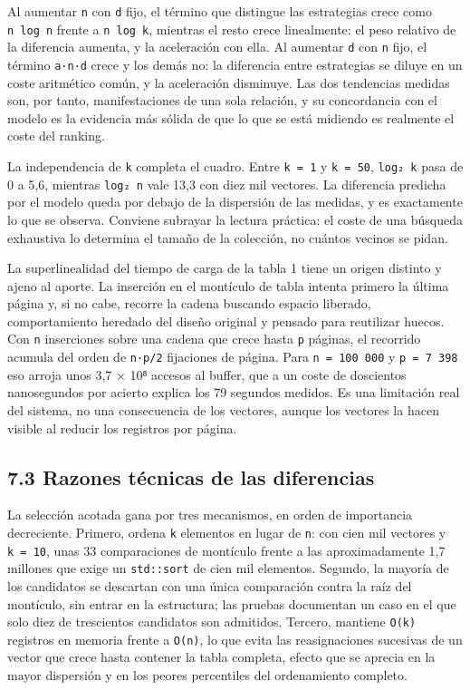 \documentclass[11pt,a4paper]{article}
\let\pandocsubsection\subsection
\let\subsection\section
\let\subsubsection\pandocsubsection
\begin{document}
Al aumentar \texttt{n} con \texttt{d} fijo, el término que distingue las
estrategias crece como \texttt{n\ log\ n} frente a \texttt{n\ log\ k},
mientras el resto crece linealmente: el peso relativo de la diferencia
aumenta, y la aceleración con ella. Al aumentar \texttt{d} con
\texttt{n} fijo, el término \texttt{a·n·d} crece y los demás no: la
diferencia entre estrategias se diluye en un coste aritmético común, y
la aceleración disminuye. Las dos tendencias medidas son, por tanto,
manifestaciones de una sola relación, y su concordancia con el modelo es
la evidencia más sólida de que lo que se está midiendo es realmente el
coste del ranking.

La independencia de \texttt{k} completa el cuadro. Entre
\texttt{k\ =\ 1} y \texttt{k\ =\ 50}, \texttt{log₂\ k} pasa de 0 a 5,6,
mientras \texttt{log₂\ n} vale 13,3 con diez mil vectores. La diferencia
predicha por el modelo queda por debajo de la dispersión de las medidas,
y es exactamente lo que se observa. Conviene subrayar la lectura
práctica: el coste de una búsqueda exhaustiva lo determina el tamaño de
la colección, no cuántos vecinos se pidan.

La superlinealidad del tiempo de carga de la tabla 1 tiene un origen
distinto y ajeno al aporte. La inserción en el montículo de tabla
intenta primero la última página y, si no cabe, recorre la cadena
buscando espacio liberado, comportamiento heredado del diseño original y
pensado para reutilizar huecos. Con \texttt{n} inserciones sobre una
cadena que crece hasta \texttt{p} páginas, el recorrido acumula del
orden de \texttt{n·p/2} fijaciones de página. Para
\texttt{n\ =\ 100\ 000} y \texttt{p\ =\ 7\ 398} eso arroja unos 3,7 ×
10⁸ accesos al buffer, que a un coste de doscientos nanosegundos por
acierto explica los 79 segundos medidos. Es una limitación real del
sistema, no una consecuencia de los vectores, aunque los vectores la
hacen visible al reducir los registros por página.

\subsubsection{7.3 Razones técnicas de las
diferencias}\label{73-razones-tuxe9cnicas-de-las-diferencias}

La selección acotada gana por tres mecanismos, en orden de importancia
decreciente. Primero, ordena \texttt{k} elementos en lugar de
\texttt{n}: con cien mil vectores y \texttt{k\ =\ 10}, unas 33
comparaciones de montículo frente a las aproximadamente 1,7 millones que
exige un \texttt{std::sort} de cien mil elementos. Segundo, la mayoría
de los candidatos se descartan con una única comparación contra la raíz
del montículo, sin entrar en la estructura; las pruebas documentan un
caso en el que solo diez de trescientos candidatos son admitidos.
Tercero, mantiene \texttt{O(k)} registros en memoria frente a
\texttt{O(n)}, lo que evita las reasignaciones sucesivas de un vector
que crece hasta contener la tabla completa, efecto que se aprecia en la
mayor dispersión y en los peores percentiles del ordenamiento completo.
\end{document}
